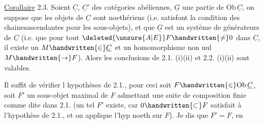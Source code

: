 \uline{Corollaire} 2.3. Soient $\underline C$, $\underline C'$ des catégories abéliennes, $\underline G$ une partie de $\mathrm{Ob}\,\underline C$, on suppose que les objets de $\underline C$ sont noethériens (i.e. satisfont la condition des chaines\handwritten{\unsure{/}}ascendantes pour les sous-objets), et que $\underline G$ est un système de générateurs de $\underline C$ (i.e. que pour tout $\deleted{\unsure{A|E}}F\handwritten{\ne}0$ dans $\underline C$, il existe un $M\handwritten{\in}\underline C$ et un homomorphisme non nul $M\handwritten{\to}F$). Alors les conclusions de 2.1. (i)(ii) et 2.2. (i)(ii) sont valables.

Il suffit de vérifier l hypothèses de 2.1., pour ceci soit $F\handwritten{\in}\mathrm{Ob}\,\underline C$,  soit $F'$ un sous-objet maximal de $F$ admettant une suite de composition finie comme dite dans 2.1. (un tel $F'$ existe, car $0\handwritten{\subset}F$ satisfait à l'hypothèse de 2.1., et on applique l'hyp noeth sur $F$). Je dis que $F'=F$, en 

